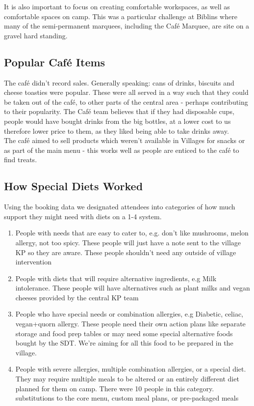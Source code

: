 It is also important to focus on creating comfortable workspaces, as well as comfortable spaces on camp. This was a particular challenge at Biblins where many of the semi-permanent marquees, including the Café Marquee, are site on a gravel hard standing.

\subsection{Popular Café Items}
The café didn't record sales. Generally speaking: cans of drinks, biscuits and cheese toasties were popular. These were all served in a way such that they could be taken out of the café, to other parts of the central area - perhaps contributing to their popularity. The Café team believes that if they had disposable cups, people would have bought drinks from the big bottles, at a lower cost to us therefore lower price to them, as they liked being able to take drinks away.\\

The café aimed to sell products which weren't available in Villages for snacks or as part of the main menu - this works well as people are enticed to the café to find treats. 
\subsection{How Special Diets Worked}
Using the booking data we designated attendees into categories of how much support they might need with diets on a 1-4 system.
\begin{enumerate}
    \item People with needs that are easy to cater to, e.g. don't like mushrooms, melon allergy, not too spicy. These people will just have a note sent to the village KP so they are aware. These people shouldn't need any outside of village intervention
    \item People with diets that will require alternative ingredients, e.g Milk intolerance. These people will have alternatives such as plant milks and vegan cheeses provided by the central KP team
    \item People who have special needs or combination allergies, e.g Diabetic, celiac, vegan+quorn allergy. These people need their own action plans like separate storage and food prep tables or may need some special alternative foods bought by the SDT. We're aiming for all this food to be prepared in the village. 
    \item People with severe allergies, multiple combination allergies, or a special diet. They may require multiple meals to be altered or an entirely different diet planned for them on camp. There were 10 people in this category. substitutions to the core menu, custom meal plans, or pre-packaged meals
\end{enumerate}
